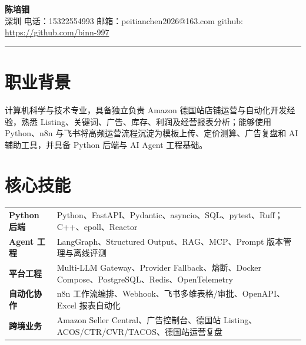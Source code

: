 \documentclass[10pt, a4paper]{article}
\begin{document}

\begin{center}
  {\fontsize{20}{24}\selectfont\bfseries 陈培钿}\\[4pt]
  {\fontsize{10}{12}\selectfont
    深圳 \quad\textbar\quad
    电话：15322554993 \quad\textbar\quad
    邮箱：peitianchen2026@163.com \quad\textbar\quad
    github: \href{https://github.com/binn-997}{https://github.com/binn-997}
  }
\end{center}

\vspace{2pt}
\noindent\rule{\textwidth}{0.4pt}
\vspace{1pt}

\section{职业背景}

{\fontsize{9}{12}\selectfont
计算机科学与技术专业，具备独立负责 Amazon 德国站店铺运营与自动化开发经验，熟悉 Listing、关键词、广告、库存、利润及经营报表分析；能够使用 Python、n8n 与飞书将高频运营流程沉淀为模板上传、定价测算、广告复盘和 AI 辅助工具，并具备 Python 后端与 AI Agent 工程基础。
}

\vspace{1pt}

\section{核心技能}

{\fontsize{9}{12}\selectfont
\begin{tabular}{@{}p{2.6cm} p{13.8cm}@{}}
\textbf{Python 后端} &
  Python、FastAPI、Pydantic、asyncio、SQL、pytest、Ruff；C++、epoll、Reactor \\[1pt]
\textbf{Agent 工程} &
  LangGraph、Structured Output、RAG、MCP、Prompt 版本管理与离线评测 \\[1pt]
\textbf{平台工程} &
  Multi-LLM Gateway、Provider Fallback、熔断、Docker Compose、PostgreSQL、Redis、OpenTelemetry \\[1pt]
\textbf{自动化协作} &
  n8n 工作流编排、Webhook、飞书多维表格/审批、OpenAPI、Excel 报表自动化 \\[1pt]
\textbf{跨境业务} &
  Amazon Seller Central、广告控制台、德国站 Listing、ACOS/CTR/CVR/TACOS、德国站运营复盘 \\[1pt]
\end{tabular}
}
\end{document}
